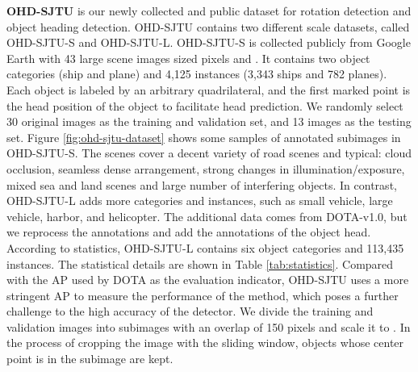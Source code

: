 \documentclass[10pt,journal,compsoc]{IEEEtran}
\begin{document}
\textbf{OHD-SJTU}
is our newly collected and public dataset for rotation detection and object heading detection. OHD-SJTU contains two different scale datasets, called OHD-SJTU-S and OHD-SJTU-L. OHD-SJTU-S is collected publicly from Google Earth with 43 large scene images sized  pixels and . It contains two object categories (ship and plane) and 4,125 instances (3,343 ships and 782 planes). Each object is labeled by an arbitrary quadrilateral, and the first marked point is the head position of the object to facilitate head prediction. We randomly select 30 original images as the training and validation set, and 13 images as the testing set. Figure \ref{fig:ohd-sjtu-dataset} shows some samples of annotated subimages in OHD-SJTU-S. The scenes cover a decent variety of road scenes and typical: cloud occlusion, seamless dense arrangement, strong changes in illumination/exposure, mixed sea and land scenes and large number of interfering objects. In contrast, OHD-SJTU-L adds more categories and instances, such as small vehicle, large vehicle, harbor, and helicopter. The additional data comes from DOTA-v1.0, but we reprocess the annotations and add the annotations of the object head. According to statistics, OHD-SJTU-L contains six object categories and 113,435 instances.
The statistical details are shown in Table \ref{tab:statistics}.
Compared with the AP used by DOTA as the evaluation indicator, OHD-SJTU uses a more stringent AP to measure the performance of the method, which poses a further challenge to the high accuracy of the detector. We divide the training and validation images into  subimages with an overlap of 150 pixels and scale it to . In the process of cropping the image with the sliding window, objects whose center point is in the subimage are kept. 
\end{document}
